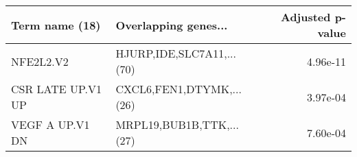 \begin{tabular}{llr}
\toprule
   Term name (18) &      Overlapping genes... &  Adjusted p-value \\
\midrule
        NFE2L2.V2 & HJURP,IDE,SLC7A11,...(70) &          4.96e-11 \\
CSR LATE UP.V1 UP &  CXCL6,FEN1,DTYMK,...(26) &          3.97e-04 \\
  VEGF A UP.V1 DN &  MRPL19,BUB1B,TTK,...(27) &          7.60e-04 \\
\bottomrule
\end{tabular}
